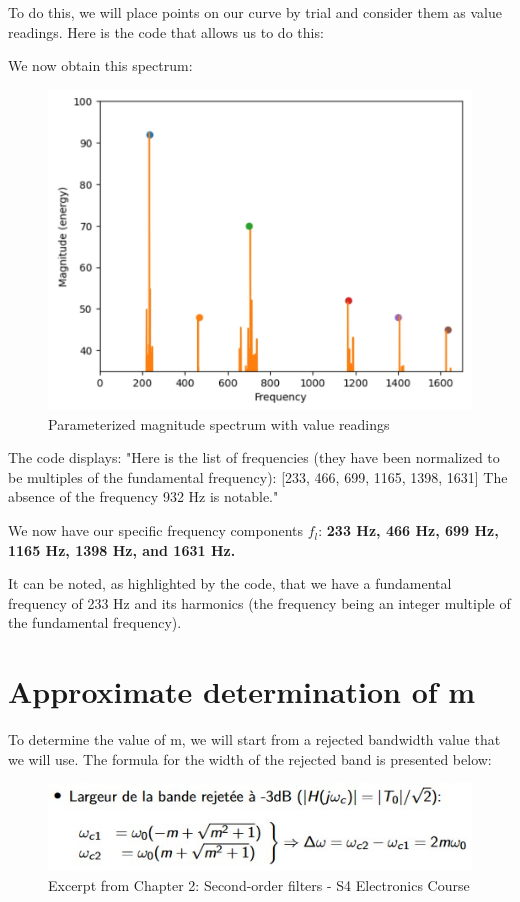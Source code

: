 To do this, we will place points on our curve by trial and consider them as value readings. Here is the code that allows us to do this:



We now obtain this spectrum:

\begin{figure}[H]
  \centering
  \includegraphics[width=0.7\linewidth]{img/Figure3.jpg}
  \caption{Parameterized magnitude spectrum with value readings}
\end{figure}

The code displays:
"Here is the list of frequencies (they have been normalized to be multiples of the fundamental frequency): [233, 466, 699, 1165, 1398, 1631] \newline
The absence of the frequency 932 Hz is notable."

We now have our specific frequency components $f_l$: \textbf{233 Hz, 466 Hz, 699 Hz, 1165 Hz, 1398 Hz, and 1631 Hz.}

It can be noted, as highlighted by the code, that we have a fundamental frequency of 233 Hz and its harmonics (the frequency being an integer multiple of the fundamental frequency).

\section{Approximate determination of m}
To determine the value of m, we will start from a rejected bandwidth value that we will use. The formula for the width of the rejected band is presented below:

\begin{figure}[H]
  \centering
  \includegraphics[width=0.7\linewidth]{img/course_excerpt.jpg}
  \caption{Excerpt from Chapter 2: Second-order filters - S4 Electronics Course}
\end{figure}

